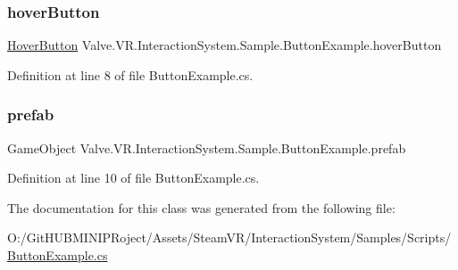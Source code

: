 \subsubsection{\texorpdfstring{hoverButton}{hoverButton}}
{\footnotesize\ttfamily \mbox{\hyperlink{class_valve_1_1_v_r_1_1_interaction_system_1_1_hover_button}{Hover\+Button}} Valve.\+V\+R.\+Interaction\+System.\+Sample.\+Button\+Example.\+hover\+Button}



Definition at line 8 of file Button\+Example.\+cs.

\mbox{\label{class_valve_1_1_v_r_1_1_interaction_system_1_1_sample_1_1_button_example_a6304ed983b27429144348fed86e6a74b}} 
\subsubsection{\texorpdfstring{prefab}{prefab}}
{\footnotesize\ttfamily Game\+Object Valve.\+V\+R.\+Interaction\+System.\+Sample.\+Button\+Example.\+prefab}



Definition at line 10 of file Button\+Example.\+cs.



The documentation for this class was generated from the following file\+:\begin{DoxyCompactItemize}
\item 
O\+:/\+Git\+H\+U\+B\+M\+I\+N\+I\+P\+Roject/\+Assets/\+Steam\+V\+R/\+Interaction\+System/\+Samples/\+Scripts/\mbox{\hyperlink{_button_example_8cs}{Button\+Example.\+cs}}\end{DoxyCompactItemize}
